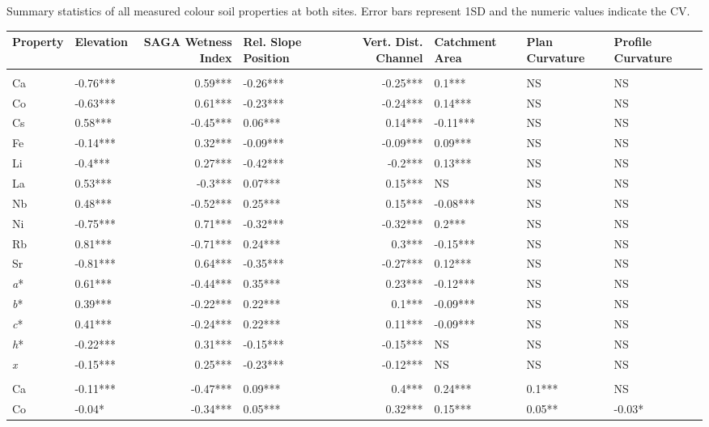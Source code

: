 \documentclass[
  number]{elsarticle}
\begin{document}
Summary statistics of all measured colour soil properties at both sites.
Error bars represent 1SD and the numeric values indicate the CV.

\label{supptab-corr-summary}
\setlength{\LTpost}{0mm}
\begin{longtable*}{llrlrlll}
\toprule
Property & Elevation & SAGA Wetness Index & Rel. Slope Position & Vert. Dist. Channel & Catchment Area & Plan Curvature & Profile Curvature \\ 
\midrule\addlinespace[2.5pt]
 \\ 
\midrule\addlinespace[2.5pt]
Ca & -0.76*** & 0.59*** & -0.26*** & -0.25*** & 0.1*** & NS & NS \\ 
Co & -0.63*** & 0.61*** & -0.23*** & -0.24*** & 0.14*** & NS & NS \\ 
Cs & 0.58*** & -0.45*** & 0.06*** & 0.14*** & -0.11*** & NS & NS \\ 
Fe & -0.14*** & 0.32*** & -0.09*** & -0.09*** & 0.09*** & NS & NS \\ 
Li & -0.4*** & 0.27*** & -0.42*** & -0.2*** & 0.13*** & NS & NS \\ 
La & 0.53*** & -0.3*** & 0.07*** & 0.15*** & NS & NS & NS \\ 
Nb & 0.48*** & -0.52*** & 0.25*** & 0.15*** & -0.08*** & NS & NS \\ 
Ni & -0.75*** & 0.71*** & -0.32*** & -0.32*** & 0.2*** & NS & NS \\ 
Rb & 0.81*** & -0.71*** & 0.24*** & 0.3*** & -0.15*** & NS & NS \\ 
Sr & -0.81*** & 0.64*** & -0.35*** & -0.27*** & 0.12*** & NS & NS \\ 
\emph{a}* & 0.61*** & -0.44*** & 0.35*** & 0.23*** & -0.12*** & NS & NS \\ 
\emph{b}* & 0.39*** & -0.22*** & 0.22*** & 0.1*** & -0.09*** & NS & NS \\ 
\emph{c}* & 0.41*** & -0.24*** & 0.22*** & 0.11*** & -0.09*** & NS & NS \\ 
\emph{h}* & -0.22*** & 0.31*** & -0.15*** & -0.15*** & NS & NS & NS \\ 
\emph{x} & -0.15*** & 0.25*** & -0.23*** & -0.12*** & NS & NS & NS \\ 
\midrule\addlinespace[2.5pt]
 \\ 
\midrule\addlinespace[2.5pt]
Ca & -0.11*** & -0.47*** & 0.09*** & 0.4*** & 0.24*** & 0.1*** & NS \\ 
Co & -0.04* & -0.34*** & 0.05*** & 0.32*** & 0.15*** & 0.05** & -0.03* \\ 

\end{longtable*}
\end{document}
